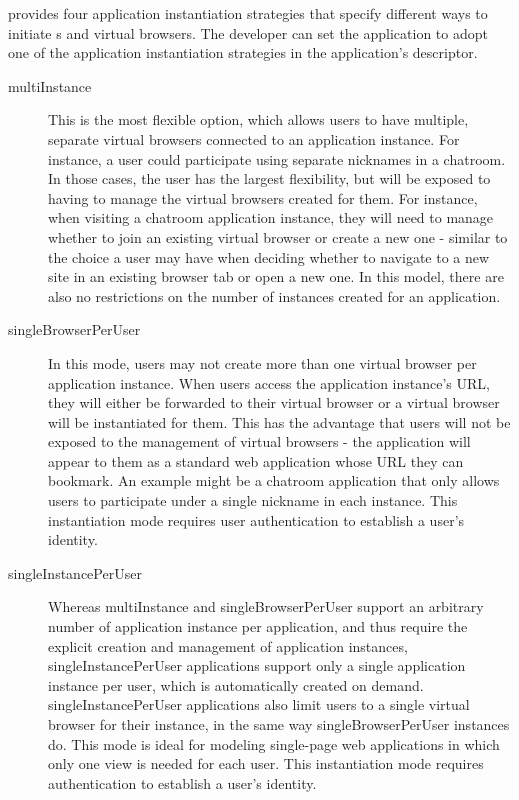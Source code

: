 \cb{} provides four application instantiation strategies that
specify different ways to initiate \appins{}s and virtual browsers.
The developer can set the application to adopt one of the application instantiation 
strategies in the application's descriptor.

\begin{description}

\item[multiInstance]
    This is the most flexible option, which
    allows users to have multiple, separate virtual browsers connected to an application
    instance. For instance, a user could participate using separate nicknames in a chatroom.
    In those cases, the user has the largest flexibility, but will be exposed to having
    to manage the virtual browsers created for them.  For instance, when visiting a chatroom
    application instance, they will need to manage whether
    to join an existing virtual browser or create a new one
    - similar to the choice a user may have when deciding whether to navigate to 
    a new site in an existing browser tab or open a new one.
    In this model, there are also no restrictions on the number of instances created
    for an application.

\item[singleBrowserPerUser]  
    In this mode, users may not create more than one virtual browser per
    application instance.  When users access the application instance's URL, they will either
    be forwarded to their virtual browser or a virtual browser will be instantiated for them.
    This has the advantage that users will not be exposed to the management of 
    virtual browsers - the application will appear to them as a standard web application
    whose URL they can bookmark.
    An example might be a chatroom application that only allows users to participate
    under a single nickname in each instance.
    This instantiation mode requires user authentication to establish a user's identity. 

\item[singleInstancePerUser] 
    Whereas multiInstance and singleBrowserPerUser support an arbitrary number of
    application instance per application, and thus require the explicit creation and
    management of application instances, singleInstancePerUser applications support only
    a single application instance per user, which is automatically created on demand.
    singleInstancePerUser applications also limit users to a single virtual browser
    for their instance, in the same way singleBrowserPerUser instances do.
    This mode is ideal for modeling single-page web applications in which only one 
    view is needed for each user.
    This instantiation mode  requires authentication to establish a user's identity. 


\end{description}
